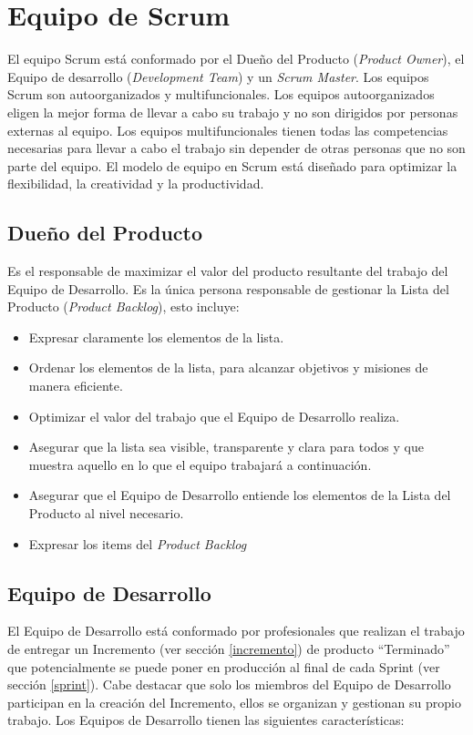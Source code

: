 \section{Equipo de Scrum}

El equipo Scrum está conformado por el Dueño del Producto (\textit{Product Owner}), el Equipo de desarrollo (\textit{Development Team}) y un \textit{Scrum Master}. Los equipos Scrum son autoorganizados y multifuncionales. Los equipos autoorganizados eligen la mejor forma de llevar a cabo su trabajo y no son dirigidos por personas externas al equipo. Los equipos multifuncionales tienen todas las competencias necesarias para llevar a cabo el trabajo sin depender de otras personas que no son parte del equipo. El modelo de equipo en Scrum está diseñado para optimizar la flexibilidad, la creatividad y la productividad. \cite{scrumSchwaber}

\subsection{Dueño del Producto} \label{productOwner}
Es el responsable de maximizar el valor del producto resultante del trabajo del Equipo de Desarrollo. Es la única persona responsable de gestionar la Lista del Producto (\textit{Product Backlog}), esto incluye:
\begin{itemize}
\item Expresar claramente los elementos de la lista.
\item Ordenar los elementos de la lista, para alcanzar objetivos y misiones de manera eficiente.
	\item Optimizar el valor del trabajo que el Equipo de Desarrollo realiza.
	\item Asegurar que la lista sea visible, transparente y clara para todos y que muestra aquello en lo que el equipo trabajará a continuación.
	\item Asegurar que el Equipo de Desarrollo entiende los elementos de la Lista del Producto al nivel necesario.
\end{itemize}

\begin{itemize}
    \item Expresar los items del \emph{Product Backlog}
\end{itemize}

\subsection{Equipo de Desarrollo}
El Equipo de Desarrollo está conformado por profesionales que realizan el trabajo de entregar un Incremento (ver sección \ref{incremento}) de producto “Terminado” que potencialmente se puede poner en producción al final de cada Sprint (ver sección \ref{sprint}). Cabe destacar que solo los miembros del Equipo de Desarrollo participan en la creación del Incremento, ellos se organizan y gestionan su propio trabajo. Los Equipos de Desarrollo tienen las siguientes características: 

